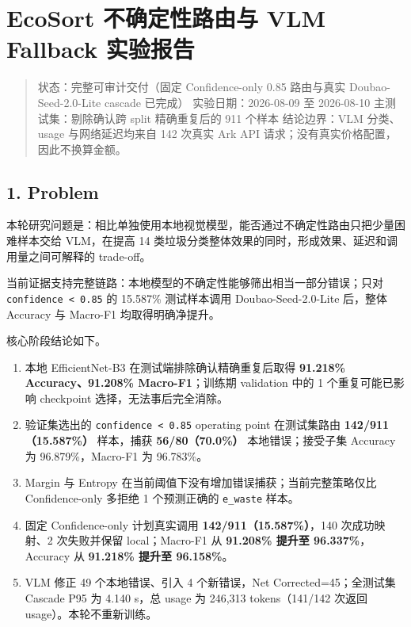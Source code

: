 \documentclass[
  a4paper,
]{article}
\author{}
\date{}
\providecommand{\tightlist}{%
  \setlength{\itemsep}{0pt}\setlength{\parskip}{0pt}}
\begin{document}
{
\hypersetup{linkcolor=}
\setcounter{tocdepth}{3}
\tableofcontents
}
\hypertarget{ecosort-ux4e0dux786eux5b9aux6027ux8defux7531ux4e0e-vlm-fallback-ux5b9eux9a8cux62a5ux544a}{%
\section{EcoSort 不确定性路由与 VLM Fallback
实验报告}\label{ecosort-ux4e0dux786eux5b9aux6027ux8defux7531ux4e0e-vlm-fallback-ux5b9eux9a8cux62a5ux544a}}

\begin{quote}
状态：完整可审计交付（固定 Confidence-only 0.85 路由与真实
Doubao-Seed-2.0-Lite cascade 已完成） 实验日期：2026-08-09 至 2026-08-10
主测试集：剔除确认跨 split 精确重复后的 911 个样本 结论边界：VLM
分类、usage 与网络延迟均来自 142 次真实 Ark API
请求；没有真实价格配置，因此不换算金额。
\end{quote}

\hypertarget{1-problem}{%
\subsection{1. Problem}\label{1-problem}}

本轮研究问题是：相比单独使用本地视觉模型，能否通过不确定性路由只把少量困难样本交给
VLM，在提高 14
类垃圾分类整体效果的同时，形成效果、延迟和调用量之间可解释的 trade-off。

当前证据支持完整链路：本地模型的不确定性能够筛出相当一部分错误；只对
\texttt{confidence\ \textless{}\ 0.85} 的 15.587\% 测试样本调用
Doubao-Seed-2.0-Lite 后，整体 Accuracy 与 Macro-F1 均取得明确净提升。

核心阶段结论如下。

\begin{enumerate}
\def\labelenumi{\arabic{enumi}.}
\tightlist
\item
  本地 EfficientNet-B3 在测试端排除确认精确重复后取得 \textbf{91.218\%
  Accuracy、91.208\% Macro-F1}；训练期 validation 中的 1
  个重复可能已影响 checkpoint 选择，无法事后完全消除。
\item
  验证集选出的 \texttt{confidence\ \textless{}\ 0.85} operating point
  在测试集路由 \textbf{142/911（15.587\%）} 样本，捕获
  \textbf{56/80（70.0\%）} 本地错误；接受子集 Accuracy 为
  96.879\%，Macro-F1 为 96.783\%。
\item
  Margin 与 Entropy 在当前阈值下没有增加错误捕获；当前完整策略仅比
  Confidence-only 多拒绝 1 个预测正确的 \texttt{e\_waste} 样本。
\item
  固定 Confidence-only 计划真实调用 \textbf{142/911（15.587\%）}，140
  次成功映射、2 次失败并保留 local；Macro-F1 从 \textbf{91.208\% 提升至
  96.337\%}，Accuracy 从 \textbf{91.218\% 提升至 96.158\%}。
\item
  VLM 修正 49 个本地错误、引入 4 个新错误，Net Corrected=45；全测试集
  Cascade P95 为 4.140 s，总 usage 为 246,313 tokens（141/142 次返回
  usage）。本轮不重新训练。
\end{enumerate}
\end{document}
